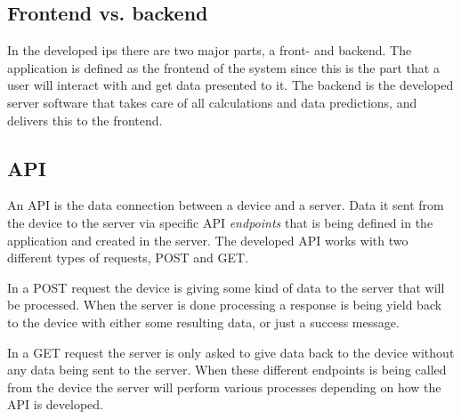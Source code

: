 \subsection{Frontend vs. backend}\label{sec:implArchitectureFrontBack}
In the developed \acrfull{ips} there are two major parts, a front- and backend.
The application is defined as the frontend of the system since this is the part that a user will interact with and get data presented to it. 
The backend is the developed server software that takes care of all calculations and data predictions, and delivers this to the frontend.


\subsection{API}\label{sec:implArchitectureApi}
An API is the data connection between a device and a server.
Data it sent from the device to the server via specific API \textit{endpoints} that is being defined in the application and created in the server.
The developed API works with two different types of requests, POST and GET.

\bigskip

In a POST request the device is giving some kind of data to the server that will be processed.
When the server is done processing a response is being yield back to the device with either some resulting data, or just a success message.

\bigskip

In a GET request the server is only asked to give data back to the device without any data being sent to the server.
When these different endpoints is being called from the device the server will perform various processes depending on how the API is developed.

